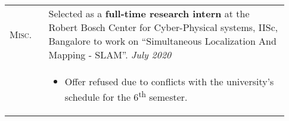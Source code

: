 \documentclass[letterpaper, 10pt, oneside]{article}
\newcommand{\stitle}[1]{\normalsize{\textsc{#1}}}
\begin{document}
\begin{longtable}{@{} p{0.13\linewidth} p{0.8\linewidth}}


    \stitle{Misc.}
                         & Selected as a \textbf{full-time research intern} at the
    Robert Bosch Center for Cyber-Physical systems, IISc, Bangalore to work on
    ``Simultaneous Localization And Mapping - SLAM''.
    \hfill \textsl{July 2020}                                                                                                                                                                                                                \\
                         & \parbox{0.8\textwidth}{                                                                                                                                                                                           %
        \begin{itemize}[leftmargin=6ex, itemsep=-0.88ex, topsep=-0.88ex]
            \item Offer refused due to conflicts with the university's schedule for the 6\textsuperscript{th} semester.
        \end{itemize}
    }
    \\[1.5ex]


\end{longtable}
\end{document}
